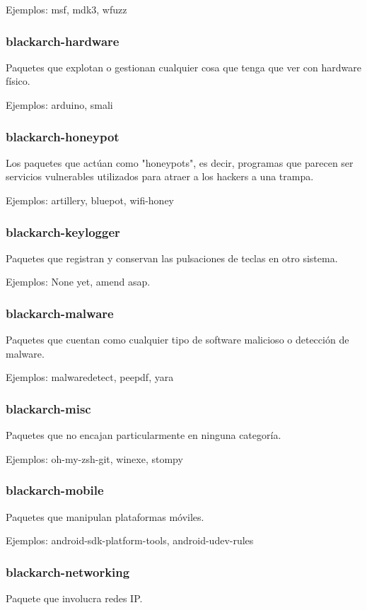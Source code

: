 \documentclass[a4paper, oneside, 11pt]{book}
\begin{document}
Ejemplos: msf, mdk3, wfuzz

\subsubsection{blackarch-hardware}
Paquetes que explotan o gestionan cualquier cosa que tenga que ver con
hardware f\'isico.

Ejemplos: arduino, smali

\subsubsection{blackarch-honeypot}
Los paquetes que actúan como "honeypots", es decir, programas que parecen
ser servicios vulnerables utilizados para atraer a los hackers a una trampa.

Ejemplos: artillery, bluepot, wifi-honey

\subsubsection{blackarch-keylogger}
Paquetes que registran y conservan las pulsaciones de teclas en otro sistema.

Ejemplos: None yet, amend asap.

\subsubsection{blackarch-malware}
Paquetes que cuentan como cualquier tipo de software malicioso o
detecci\'on de malware.

Ejemplos: malwaredetect, peepdf, yara

\subsubsection{blackarch-misc}
Paquetes que no encajan particularmente en ninguna categor\'ia.

Ejemplos: oh-my-zsh-git, winexe, stompy

\subsubsection{blackarch-mobile}
Paquetes que manipulan plataformas m\'oviles.

Ejemplos: android-sdk-platform-tools, android-udev-rules

\subsubsection{blackarch-networking}
Paquete que involucra redes IP.
\end{document}
